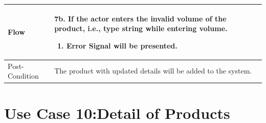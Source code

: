 \documentclass[12pt,a4paper]{report}
\begin{document}
\begin{tabular}{ | m{3cm} | m{12cm}| } \hline
Flow & 7b. If the actor enters the invalid volume of the product, i.e., type string while entering volume.
 	\begin{enumerate}
		\item Error Signal will be presented.
	\end{enumerate}
\\ \hline
Post-Condition &    The product with updated details will be added to the system.\\ \hline

\end{tabular}


\section{Use Case 10:Detail of Products  }
\end{document}
